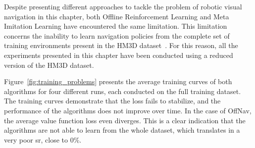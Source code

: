 Despite presenting different approaches to tackle the problem of robotic visual navigation in this chapter, both Offline Reinforcement Learning and Meta Imitation Learning have encountered the same limitation.
This limitation concerns the inability to learn navigation policies from the complete set of training environments present in the HM3D dataset~\cite{Ramakrishnan2021HabitatMatterport3D}.
For this reason, all the experiments presented in this chapter have been conducted using a reduced version of the HM3D dataset.

Figure~\ref{fig:training_problems} presents the average training curves of both algorithms for four different runs, each conducted on the full training dataset.
The training curves demonstrate that the loss fails to stabilize, and the performance of the algorithms does not improve over time.
In the case of OffNav, the average value function loss even diverges.
This is a clear indication that the algorithms are not able to learn from the whole dataset, which translates in a very poor \acrshort{sr}, close to 0\%.

